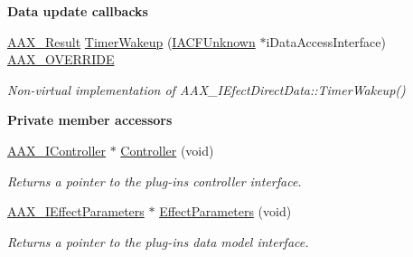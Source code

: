 \begin{Indent}{\bf Data update callbacks}\par
\begin{DoxyCompactItemize}
\item 
\hyperlink{a00149_a4d8f69a697df7f70c3a8e9b8ee130d2f}{A\+A\+X\+\_\+\+Result} \hyperlink{a00016_a3ed665cfbece195524e208e61b4d1937}{Timer\+Wakeup} (\hyperlink{a00146}{I\+A\+C\+F\+Unknown} $\ast$i\+Data\+Access\+Interface) \hyperlink{a00149_ac2f24a5172689ae684344abdcce55463}{A\+A\+X\+\_\+\+O\+V\+E\+R\+R\+I\+D\+E}
\begin{DoxyCompactList}\small\item\em Non-\/virtual implementation of A\+A\+X\+\_\+\+I\+Efect\+Direct\+Data\+::\+Timer\+Wakeup() \end{DoxyCompactList}\end{DoxyCompactItemize}
\end{Indent}
\begin{Indent}{\bf Private member accessors}\par
\begin{DoxyCompactItemize}
\item 
\hyperlink{a00090}{A\+A\+X\+\_\+\+I\+Controller} $\ast$ \hyperlink{a00016_a33ddee1a300bb3f2584fa224975d362b}{Controller} (void)
\begin{DoxyCompactList}\small\item\em Returns a pointer to the plug-\/in\textquotesingle{}s controller interface. \end{DoxyCompactList}\item 
\hyperlink{a00099}{A\+A\+X\+\_\+\+I\+Effect\+Parameters} $\ast$ \hyperlink{a00016_a774a00f86f4851001f735f161187b05f}{Effect\+Parameters} (void)
\begin{DoxyCompactList}\small\item\em Returns a pointer to the plug-\/in\textquotesingle{}s data model interface. \end{DoxyCompactList}\end{DoxyCompactItemize}
\end{Indent}
